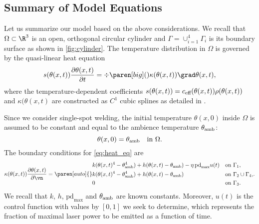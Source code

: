 \subsection{Summary of Model Equations}
\label{subsec:equations}

Let us summarize our model based on the above considerations.
We recall that $\Omega\subset \R^3$ is an open, orthogonal circular cylinder and $\Gamma = \cup_{i=1}^4 \Gamma_i$ is its boundary surface as shown in \cref{fig:cylinder}. 
The temperature distribution in $\Omega$ is governed by the quasi-linear heat equation
\begin{equation} \label{eq:heat_eq}
	s(\theta(x,t)) \frac{\partial \theta(x,t)}{\partial t} 
	= 
	\div \paren[big](){\kappa(\theta(x,t)) \grad\theta(x,t)}
	,
\end{equation}
where the temperature-dependent coefficients $s(\theta(x,t)) = c_\textup{eff}(\theta(x,t)) \rho(\theta(x,t))$ and $\kappa(\theta(x,t)$ are constructed as $C^1$ cubic splines as detailed in \cite[\texttt{optipuls.coefficients}]{optipuls_github}.

Since we consider single-spot welding, the initial temperature $\theta(x,0)$ inside $\Omega$ is assumed to be constant and equal to the ambience temperature $\theta_\textup{amb}$:
\begin{equation} \label{eq:heat_eq_ic}
	\theta(x,0)
	=
	\theta_\textup{amb}
	\quad
	\text{in } \Omega
	.
\end{equation}
The boundary conditions for \eqref{eq:heat_eq} are
\begin{equation} \label{eq:heat_eq_bc}
	\kappa(\theta(x,t)) \frac{\partial \theta(x,t)}{\partial \vn} 
	= 
	\paren[auto]\{\}{%
		\begin{aligned}
			&
			k (\theta(x,t)^4 - \theta_\textup{amb}^4) + h (\theta(x,t) - \theta_\textup{amb}) - \eta\, \text{pd}_{\max} u(t)
			& 
			& 
			\text{on } \Gamma_1
			, 
			\\
			& 
			k (\theta(x,t)^4 - \theta_\textup{amb}^4) + h (\theta(x,t) - \theta_\textup{amb})
			& 
			& 
			\text{on } \Gamma_2 \cup \Gamma_4
			, 
			\\
			& 
			0
			& 
			& 
			\text{on } \Gamma_3
			.
		\end{aligned}
	}
	.
\end{equation}
We recall that $k$, $h$, $\text{pd}_{\max}$ and $\theta_\textup{amb}$ are known constants.
Moreover, $u(t)$ is the control function with values by $[0,1]$ we seek to determine, which represents the fraction of maximal laser power to be emitted as a function of time.


